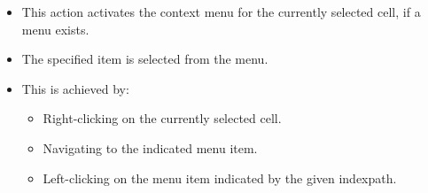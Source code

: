  \begin{itemize}
\item This action activates the context menu for the currently selected cell, if a menu exists.
\item The specified item is  selected from the menu.
\item This is achieved by:
  \begin{itemize}
    \item Right-clicking on the currently selected cell.
    \item Navigating to the indicated menu item.
    \item Left-clicking on the menu item indicated by the given indexpath.
  \end{itemize}

\end{itemize} 
